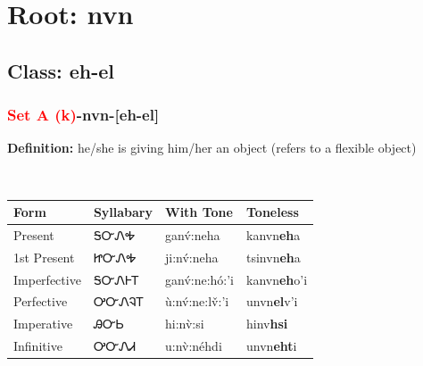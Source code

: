 \needspace{4in}
\section*{Root: nvn}
\nopagebreak
{}
\needspace{3in}
\subsection*{Class: eh-el}
\nopagebreak
\needspace{2in}
\subsubsection*{\textcolor{Red}{Set A (k)}{-}\textbf{nvn}{-}[eh-el]}
\nopagebreak
\textbf{Definition: } he/she is giving him/her an object (refers to a flexible object)
\\[0.5em]
\begin{tabularx}{\textwidth}{l X X X}%
\toprule%
\textbf{Form}&\textbf{Syllabary}&\textbf{With Tone}&\textbf{Toneless}\\%
\midrule%
Present&ᎦᏅᏁᎭ&ganv́:neha&kanvn\textbf{eh}a\\%
1st Present&ᏥᏅᏁᎭ&ji:nv́:neha&tsinvn\textbf{eh}a\\%
Imperfective&ᎦᏅᏁᎰᎢ&ganv́:ne:hó:’i&kanvn\textbf{eh}o'i\\%
Perfective&ᎤᏅᏁᎸᎢ&ù:nv́:ne:lv̌:’i&unvn\textbf{el}v'i\\%
Imperative&ᎯᏅᏏ&hi:nv̀:si&hinv\textbf{hsi}\\%
Infinitive&ᎤᏅᏁᏗ&u:nv̀:néhdi&unvn\textbf{eht}i\\%
\bottomrule%
\end{tabularx}
\\[1em]